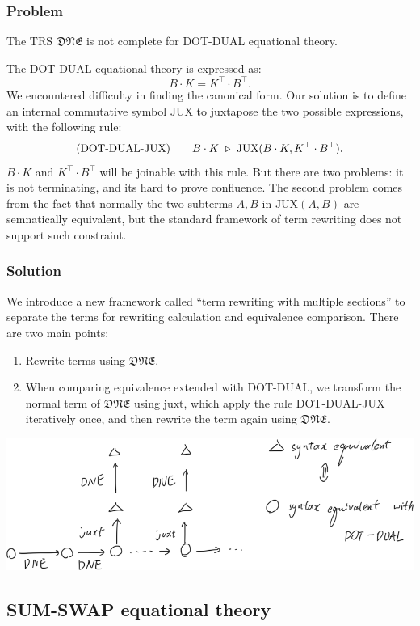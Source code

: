 \subsubsection*{Problem}
The TRS $\mathfrak{DNE}$ is not complete for \textsf{DOT-DUAL} equational theory.

The \textsf{DOT-DUAL} equational theory is expressed as:
$$
B \cdot K = K^\top \cdot B^\top.
$$
We encountered difficulty in finding the canonical form. Our solution is to define an internal commutative symbol $\textrm{JUX}$ to juxtapose the two possible expressions, with the following rule:
$$
\textrm{(DOT-DUAL-JUX)} \qquad B \cdot K \ \triangleright\  \textrm{JUX}(B \cdot K, K^\top \cdot B^\top).
$$
$B\cdot K$ and $K^\top \cdot B^\top$ will be joinable with this rule. But there are two problems: it is not terminating, and its hard to prove confluence. The second problem comes from the fact that normally the two subterms $A, B$ in $\textrm{JUX}(A, B)$ are semnatically equivalent, but the standard framework of term rewriting does not support such constraint. 

\subsubsection*{Solution}
We introduce a new framework called ``term rewriting with multiple sections'' to separate the terms for rewriting calculation and equivalence comparison. There are two main points:
\begin{enumerate}
    \item Rewrite terms using $\mathfrak{DNE}$.
    \item When comparing equivalence extended with \textsf{DOT-DUAL}, we transform the normal term of $\mathfrak{DNE}$ using $\textrm{juxt}$, which apply the rule DOT-DUAL-JUX iteratively once, and then rewrite the term again using $\mathfrak{DNE}$.
\end{enumerate}

\begin{center}
    \includegraphics*[width=.8\textwidth]{fig/DNE-JUX.png}
\end{center}

\subsection{\textsf{SUM-SWAP} equational theory}
